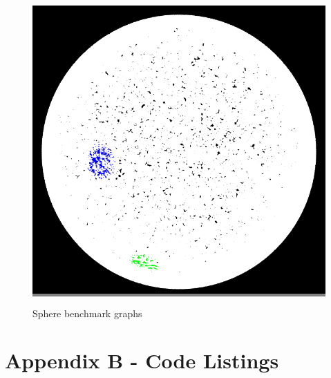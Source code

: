 \documentclass{article}
\begin{document}
\begin{figure}
\begin{minipage}{0.45\textwidth}
    \end{minipage}
    \vskip 0.25in
    \begin{minipage}{0.45\textwidth}
    \colorbox{gray}{\includegraphics[width=\linewidth]{./images/sphere_2.png}}
    \end{minipage}

    \caption{Sphere benchmark graphs}
    \label{spheres}
\end{figure}

\newpage

\section{Appendix B - Code Listings}

\lstset{style=codestyle}




\end{document}
